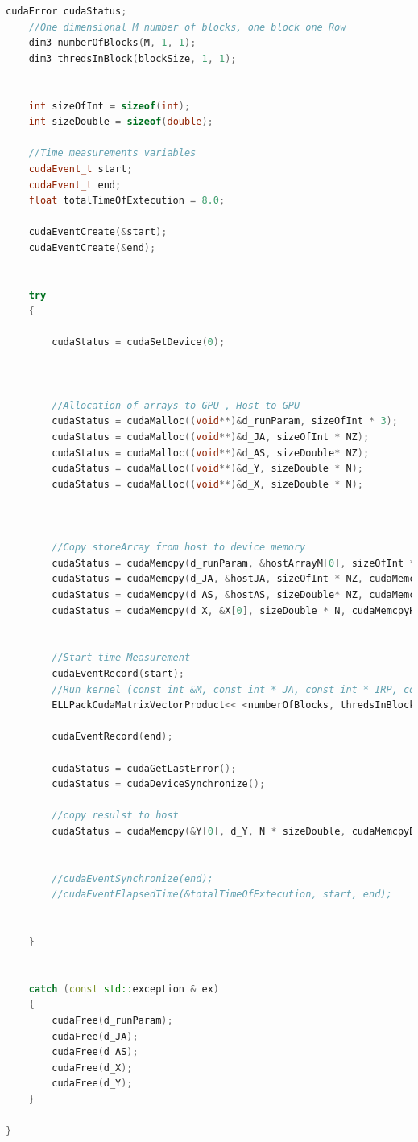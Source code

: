 \documentclass{scrreprt}
\begin{document}
\begin{lstlisting}[language=C++, caption=CudaSolver.cu]
	cudaError cudaStatus;
	//One dimensional M number of blocks, one block one Row 
	dim3 numberOfBlocks(M, 1, 1);
	dim3 thredsInBlock(blockSize, 1, 1);


	int sizeOfInt = sizeof(int);
	int sizeDouble = sizeof(double);

	//Time measurements variables
	cudaEvent_t start;
	cudaEvent_t end;
	float totalTimeOfExtecution = 8.0;

	cudaEventCreate(&start);
	cudaEventCreate(&end);


	try
	{

		cudaStatus = cudaSetDevice(0);



		//Allocation of arrays to GPU , Host to GPU
		cudaStatus = cudaMalloc((void**)&d_runParam, sizeOfInt * 3);
		cudaStatus = cudaMalloc((void**)&d_JA, sizeOfInt * NZ);
		cudaStatus = cudaMalloc((void**)&d_AS, sizeDouble* NZ);
		cudaStatus = cudaMalloc((void**)&d_Y, sizeDouble * N);
		cudaStatus = cudaMalloc((void**)&d_X, sizeDouble * N);



		//Copy storeArray from host to device memory
		cudaStatus = cudaMemcpy(d_runParam, &hostArrayM[0], sizeOfInt * 3, cudaMemcpyHostToDevice);
		cudaStatus = cudaMemcpy(d_JA, &hostJA, sizeOfInt * NZ, cudaMemcpyHostToDevice);
		cudaStatus = cudaMemcpy(d_AS, &hostAS, sizeDouble* NZ, cudaMemcpyHostToDevice);
		cudaStatus = cudaMemcpy(d_X, &X[0], sizeDouble * N, cudaMemcpyHostToDevice);


		//Start time Measurement 
		cudaEventRecord(start);
		//Run kernel (const int &M, const int * JA, const int * IRP, const int * AS, double * OUT, double * IN)
		ELLPackCudaMatrixVectorProduct<< <numberOfBlocks, thredsInBlock, blockSize * sizeDouble >> > (M, NZ, d_JA, d_AS, d_X, d_Y, maxBlocks);

		cudaEventRecord(end);

		cudaStatus = cudaGetLastError();
		cudaStatus = cudaDeviceSynchronize();

		//copy resulst to host
		cudaStatus = cudaMemcpy(&Y[0], d_Y, N * sizeDouble, cudaMemcpyDeviceToHost);


		//cudaEventSynchronize(end);
		//cudaEventElapsedTime(&totalTimeOfExtecution, start, end);


	}


	catch (const std::exception & ex)
	{
		cudaFree(d_runParam);
		cudaFree(d_JA);
		cudaFree(d_AS);
		cudaFree(d_X);
		cudaFree(d_Y);
	}

}





\end{lstlisting}
\end{document}
